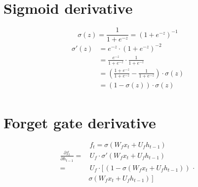 \documentclass[9pt]{article}
\newcommand{\del}{\partial}
\begin{document}
\section*{Sigmoid derivative}
\begin{equation*}
	\sigma(z) = \frac{1}{1+e^{-z}} = (1+e^{-z})^{-1}
\end{equation*}
\begin{equation*}
\begin{split}
	\sigma'(z) &= e^{-z}\cdot(1+e^{-z})^{-2}\\
	           &= \frac{e^{-z}}{1+e^{-z}}\cdot\frac{1}{1+e^{-z}}\\
	           &= \left(\frac{1+e^{-z}}{1+e^{-z}} - \frac{1}{1+e^{-z}}\right)\cdot\sigma(z)\\
	           &= \left(1 - \sigma(z)\right)\cdot\sigma(z)\\
\end{split}
\end{equation*}

\section*{Forget gate derivative}
\begin{equation*}
	f_t = \sigma(W_{f}{x_{t}} + U_{f}{h_{t-1}})
\end{equation*}
\begin{equation*}
\begin{split}
	\frac{\del f_t}{\del h_{t-1}} = & \,U_{f} \cdot \sigma'(W_{f}{x_{t}} + U_{f}{h_{t-1}})\\
	                              = & \,U_{f} \cdot [\,\left(1 - \sigma(W_{f}{x_{t}} + U_{f}{h_{t-1}})\right)\,\cdot\\
	                                & \sigma(W_{f}{x_{t}} + U_{f}{h_{t-1}})\,]\\
\end{split}
\end{equation*}
\end{document}
